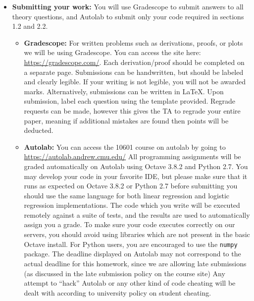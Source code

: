 \documentclass[a4paper]{article}
\theoremstyle{definition}
\begin{document}
\begin{itemize}
\item\textbf{Submitting your work:} You will use Gradescope to submit answers to all theory questions, and Autolab to submit only your code required in sections 1.2 and 2.2.

\begin{itemize}


\item \textbf{Gradescope:} For written problems such as derivations, proofs, or plots we will be using Gradescope.  You can access the site here: \url{https://gradescope.com/}. Each derivation/proof should be completed on a separate page. Submissions can be handwritten, but should be labeled and clearly legible.  If your writing is not legible, you will not be awarded marks.  Alternatively, submissions can be written in LaTeX.  Upon submission, label each question using the template provided. Regrade requests can be made, however this gives the TA to regrade your entire paper, meaning if additional mistakes are found then points will be deducted.

\item \textbf{Autolab:} You can access the 10601 course on autolab by going to \url{https://autolab.andrew.cmu.edu/} All programming assignments will be graded automatically on Autolab using Octave 3.8.2 and Python 2.7. You may develop your code in your favorite IDE, but please make sure that it runs as expected on Octave 3.8.2 or Python 2.7 before submitting you should use the same language for both linear regression and logistic regression implementations. The code which you write will be executed remotely against a suite of tests, and the results are used to automatically assign you a grade. To make sure your code executes correctly on our servers, you should avoid using libraries which are not present in the basic Octave install. For Python users, you are encouraged to use the \texttt{numpy} package. The deadline displayed on Autolab may not correspond to the actual deadline for this homework, since we are allowing late submissions (as discussed in the late submission policy on the course site) Any attempt to ``hack'' Autolab or any other kind of code cheating will be dealt with according to university policy on student cheating.
  
\end{itemize}
  
\end{itemize}
\end{document}

